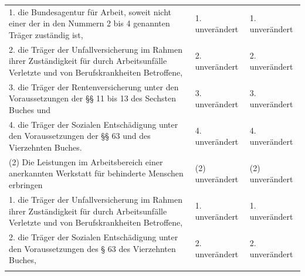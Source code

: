 \documentclass[10pt,a4paper,landscape]{article}
\begin{document}
\begin{longtable}{|L{8.2cm}|L{8.2cm}|L{8.2cm}|}
\hhline{|---|}
1.  \newline die Bundesagentur für Arbeit, soweit nicht  \newline einer der in den Nummern 2 bis 4  \newline genannten Träger zuständig ist, & 1. unverändert & 1. unverändert \\
\hhline{|---|}
2.   \newline die Träger der Unfallversicherung im  \newline Rahmen ihrer Zuständigkeit für durch  \newline Arbeitsunfälle Verletzte und von  \newline Berufskrankheiten Betroffene, & 2. unverändert & 2. unverändert \\
\hhline{|---|}
3.  \newline die Träger der Rentenversicherung unter  \newline den Voraussetzungen der \S{}\S{} 11 bis 13 des  \newline Sechsten Buches und & 3. unverändert & 3. unverändert \\
\hhline{|---|}
4.  \newline die Träger der Sozialen Entschädigung  \newline unter den Voraussetzungen der \S{}\S{} 63 und   des Vierzehnten Buches. & 4. unverändert & 4. unverändert \\
\hhline{|---|}
(2) Die Leistungen im Arbeitsbereich einer  \newline anerkannten Werkstatt für behinderte  \newline Menschen erbringen & (2) unverändert & (2) unverändert \\
\hhline{|---|}
1.  \newline die Träger der Unfallversicherung im  \newline Rahmen ihrer Zuständigkeit für durch  \newline Arbeitsunfälle Verletzte und von  \newline Berufskrankheiten Betroffene, & 1. unverändert & 1. unverändert \\
\hhline{|---|}
2.  \newline die Träger der Sozialen Entschädigung  \newline unter den Voraussetzungen des \S{} 63 des  \newline Vierzehnten Buches, & 2. unverändert & 2. unverändert \\
\hhline{|---|}

\end{longtable}
\end{document}
